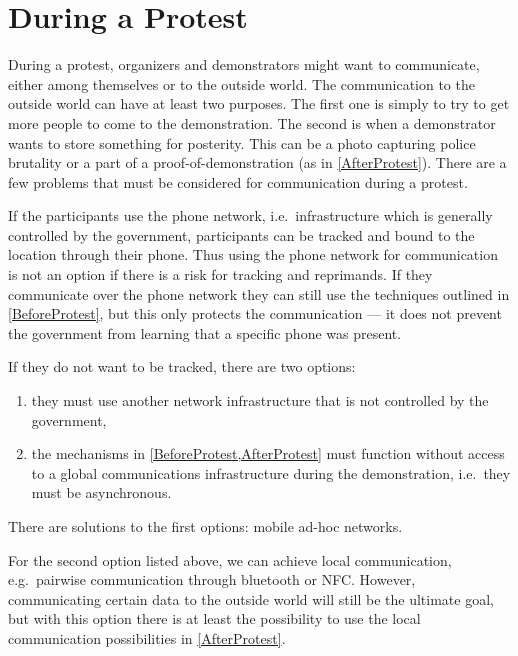 \section{During a Protest}
\label{DuringProtest}

During a protest, organizers and demonstrators might want to communicate, 
either among themselves or to the outside world.
The communication to the outside world can have at least two purposes.
The first one is simply to try to get more people to come to the demonstration.
The second is when a demonstrator wants to store something for posterity.
This can be a photo capturing police brutality or a part of 
a proof-of-demonstration (as in \cref{AfterProtest}).
There are a few problems that must be considered for communication during 
a protest.

If the participants use the phone network, i.e.\ infrastructure which is 
generally controlled by the government, participants can be tracked and bound 
to the location through their phone.
Thus using the phone network for communication is not an option if there is 
a risk for tracking and reprimands.
If they communicate over the phone network they can still use the techniques 
outlined in \cref{BeforeProtest}, but this only protects the communication --- 
it does not prevent the government from learning that a specific phone was 
present.

If they do not want to be tracked, there are two options:
\begin{enumerate}
  \item they must use another network infrastructure that is not controlled by 
    the government,
  \item the mechanisms in \cref{BeforeProtest,AfterProtest} must
    function without access to a global communications infrastructure during 
    the demonstration, i.e.\ they must be asynchronous.
\end{enumerate}
There are solutions to the first options: mobile ad-hoc networks.


For the second option listed above, we can achieve local communication, e.g.\ 
pairwise communication through bluetooth or \ac{NFC}.
However, communicating certain data to the outside world will still be the 
ultimate goal, but with this option there is at least the possibility to use 
the local communication possibilities in \cref{AfterProtest}.

